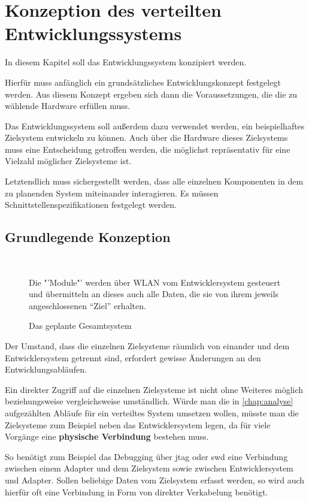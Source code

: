 \chapter{Konzeption des verteilten Entwicklungssystems}\label{chap:konzeption}
\minitoc
In diesem Kapitel soll das Entwicklungssystem konzipiert werden.

Hierfür muss anfänglich ein grundsätzliches Entwicklungskonzept festgelegt
werden. Aus diesem Konzept ergeben sich dann die Voraussetzungen, die die zu
wählende Hardware erfüllen muss.

Das Entwicklungssystem soll außerdem dazu verwendet werden, ein
beispielhaftes Zielsystem entwickeln zu können. Auch über die Hardware dieses
Zielsystems muss eine Entscheidung getroffen werden, die möglichst
repräsentativ für eine Vielzahl möglicher Zielsysteme ist.

Letztendlich muss sichergestellt werden, dass alle einzelnen Komponenten in dem
zu planenden System miteinander interagieren. Es müssen
Schnittstellenspezifikationen festgelegt werden.
\section{Grundlegende Konzeption}
\begin{figure}[!ht]
\centering
\def\svgwidth{0.88\columnwidth}
\\
\caption{Das geplante Gesamtsystem}{Die "'Module"' werden über WLAN
vom Entwicklersystem gesteuert und übermitteln an dieses auch alle
Daten, die sie von ihrem jeweils angeschlossenen "`Ziel"' erhalten.}
\label{fig:sys}
\end{figure}
Der Umstand, dass die einzelnen Zielsysteme räumlich von einander und dem
Entwicklersystem getrennt sind, erfordert gewisse Änderungen an den
Entwicklungsabläufen.

Ein direkter Zugriff auf die einzelnen Zielsysteme ist nicht ohne Weiteres
möglich beziehungsweise vergleichsweise umständlich. Würde man die in
\autoref{chap:analyse} aufgezählten Abläufe für ein verteiltes System umsetzen
wollen, müsste man die Zielsysteme zum Beispiel neben das Entwicklersystem
legen, da für viele Vorgänge eine \textbf{physische Verbindung} bestehen muss.

So benötigt zum Beispiel das Debugging über \gls{jtag} oder \gls{swd} eine
Verbindung zwischen einem Adapter und dem Zielsystem sowie zwischen
Entwicklersystem und Adapter. Sollen beliebige Daten vom Zielsystem erfasst
werden, so wird auch hierfür oft eine Verbindung in Form von direkter
Verkabelung benötigt.

